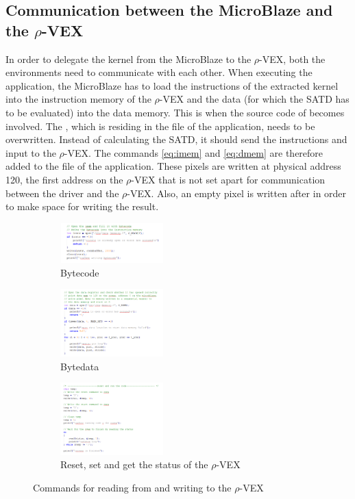 \subsection{Communication between the MicroBlaze and the $\rho$-VEX}

In order to delegate the  kernel from the MicroBlaze to the $\rho$-VEX, both the environments need to communicate with each other. When executing the  application, the MicroBlaze has to load the instructions of the extracted kernel into the instruction memory of the $\rho$-VEX and the data (for which the SATD has to be evaluated) into the data memory. This is when the source code of  becomes involved. The , which is residing in the  file of the application, needs to be overwritten. Instead of calculating the SATD, it should send the instructions and input to the $\rho$-VEX. The commands \ref{eq:imem} and \ref{eq:dmem} are therefore added to the  file of the  application. These pixels are written at physical address 120, the first address on the $\rho$-VEX that is not set apart for communication between the driver and the $\rho$-VEX. Also, an empty pixel is written after  in order to make space for writing the result. 

\begin{figure}
	\centering
	\begin{subfigure} [h] {0.3\textwidth}
		\centering
		\includegraphics[width=150px]{Pictures/imem}
		\caption{Bytecode}
		\label{fig:imem}
	\end{subfigure}
	\quad
	\begin{subfigure} [h] {0.3\textwidth}
		\centering
		\includegraphics[width=150px]{Pictures/dmem}
		\caption{Bytedata}
		\label{fig:dmem}
	\end{subfigure}
	\quad
	\begin{subfigure} [h] {0.3\textwidth}
		\centering
		\includegraphics[width=150px]{Pictures/smem}
		\caption{Reset, set and get the status of the $\rho$-VEX}
		\label{fig:smem}
	\end{subfigure}
	\quad
\caption{Commands for reading from and writing to the $\rho$-VEX}%
\label{}%
\end{figure}

